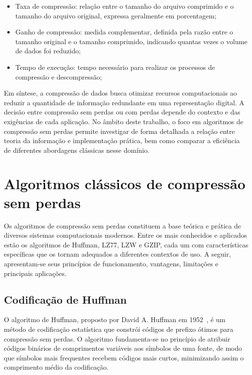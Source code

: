\begin{itemize}
    \item Taxa de compressão: relação entre o tamanho do arquivo comprimido e o tamanho do arquivo original, expressa geralmente em porcentagem;
    \item Ganho de compressão: medida complementar, definida pela razão entre o tamanho original e o tamanho comprimido, indicando quantas vezes o volume de dados foi reduzido;
    \item Tempo de execução: tempo necessário para realizar os processos de compressão e descompressão;
\end{itemize}

Em síntese, a compressão de dados busca otimizar recursos computacionais ao reduzir a quantidade de informação redundante em uma representação digital. A decisão entre compressão sem perdas ou com perdas depende do contexto e das exigências de cada aplicação. No âmbito deste trabalho, o foco em algoritmos de compressão sem perdas permite investigar de forma detalhada a relação entre teoria da informação e implementação prática, bem como comparar a eficiência de diferentes abordagens clássicas nesse domínio.

\section{Algoritmos clássicos de compressão sem perdas}
\label{sec:algoritmos}

Os algoritmos de compressão sem perdas constituem a base teórica e prática de diversos sistemas computacionais modernos. Entre os mais conhecidos e aplicados estão os algoritmos de Huffman, LZ77, LZW e GZIP, cada um com características específicas que os tornam adequados a diferentes contextos de uso. A seguir, apresentam-se seus princípios de funcionamento, vantagens, limitações e principais aplicações.

\subsection{Codificação de Huffman}

O algoritmo de Huffman, proposto por David A. Huffman em 1952~\cite{huffman1952method}, é um método de codificação estatística que constrói códigos de prefixo ótimos para compressão sem perdas. O algoritmo fundamenta-se no princípio de atribuir códigos binários de comprimentos variáveis aos símbolos de uma fonte, de modo que símbolos mais frequentes recebem códigos mais curtos, minimizando assim o comprimento médio da codificação.

